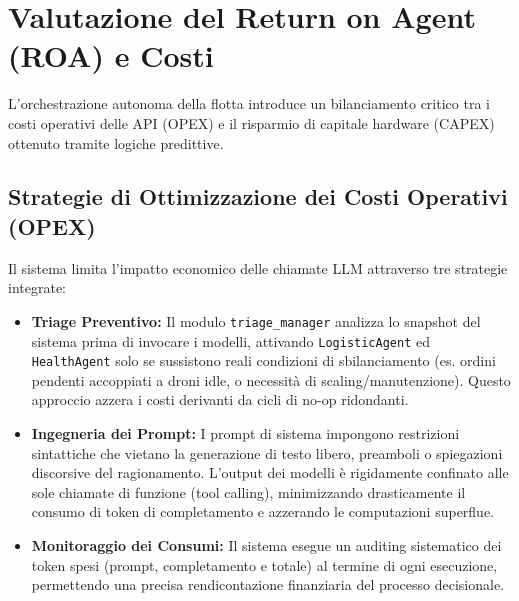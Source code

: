 \section{Valutazione del Return on Agent (ROA) e Costi}
\label{sec:roa}
L'orchestrazione autonoma della flotta introduce un bilanciamento critico tra i costi operativi delle API (OPEX) e il risparmio di capitale hardware (CAPEX) ottenuto tramite logiche predittive.

\subsection{Strategie di Ottimizzazione dei Costi Operativi (OPEX)}
Il sistema limita l'impatto economico delle chiamate LLM attraverso tre strategie integrate:
\begin{itemize}
    \item \textbf{Triage Preventivo:} Il modulo \texttt{triage\_manager} analizza lo snapshot del sistema prima di invocare i modelli, attivando \texttt{LogisticAgent} ed \texttt{HealthAgent} solo se sussistono reali condizioni di sbilanciamento (es. ordini pendenti accoppiati a droni idle, o necessità di scaling/manutenzione). Questo approccio azzera i costi derivanti da cicli di no-op ridondanti.
    \item \textbf{Ingegneria dei Prompt:} I prompt di sistema impongono restrizioni sintattiche che vietano la generazione di testo libero, preamboli o spiegazioni discorsive del ragionamento. L'output dei modelli è rigidamente confinato alle sole chiamate di funzione (tool calling), minimizzando drasticamente il consumo di token di completamento e azzerando le computazioni superflue.
    \item \textbf{Monitoraggio dei Consumi:} Il sistema esegue un auditing sistematico dei token spesi (prompt, completamento e totale) al termine di ogni esecuzione, permettendo una precisa rendicontazione finanziaria del processo decisionale.
\end{itemize}

